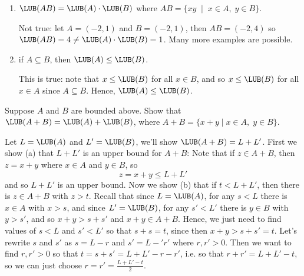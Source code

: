 \documentclass[11pt,dvipsnames]{book}
\numberwithin{figure}{section} %
\numberwithin{table}{section} %
\begin{document}
\begin{exercise}
\begin{enumerate}[label=(\alph*)]
\item $\LUB(AB)=\LUB(A)\cdot \LUB(B)$ where $AB=\{xy \;\; | \;\; x\in A,\; y\in B\}$.
\begin{solution}
Not true: let $A=(-2,1)$ and $B=(-2,1)$, then $AB=(-2,4)$ so $\LUB(AB)=4\neq \LUB(A)\cdot \LUB(B)=1$. Many more examples are possible.
\end{solution}
\item if $A\subseteq B$, then $\LUB(A)\leq \LUB(B)$.
\begin{solution}
This is true: note that $x\leq \LUB(B)$ for all $x\in B$, and so $x\leq \LUB(B)$ for all $x\in A$ since $A\subseteq B$. Hence, $\LUB(A)\leq \LUB(B)$.
\end{solution}
\end{enumerate}

\end{exercise}

\begin{exercise}
Suppose $A$ and $B$ are bounded above. Show that $\LUB(A+B)=\LUB(A)+\LUB(B)$, where $A+B=\{x+y\; | \; x\in A,\; y\in B\}$.
\begin{solution}
Let $L=\LUB(A)$ and $L'=\LUB(B)$, we'll show $\LUB(A+B)=L+L'$. First we show (a) that $L+L'$ is an upper bound for $A+B$: Note that if $z\in A+B$, then $z=x+y$ where $x\in A$ and $y\in B$, so
\[
z=x+y\leq L+L'
\]
and so $L+L'$ is an upper bound. Now we show (b) that if $t<L+L'$, then there is $z\in A+B$ with $z>t$. Recall that since $L=\LUB(A)$, for any $s<L$ there is $x\in A$ with $x>s$, and since $L'=\LUB(B)$, for any $s'<L'$ there is $y\in B$ with $y>s'$, and so $x+y>s+s'$ and $x+y\in A+B$. Hence, we just need to find values of $s<L$ and $s'<L'$ so that $s+s= t$, since then $x+y>s+s'= t$. Let's rewrite $s$ and $s'$ as $s=L-r$ and $s'=L-'r'$ where $r,r'>0$. Then we want to find $r,r'>0$ so that $t=s+s'=L+L'-r-r'$, i.e. so that $r+r'=L+L'-t$, so we can just choose $r=r'=\frac{L+L'-t}{2}$.
\end{solution}
\end{exercise}
\end{document}
